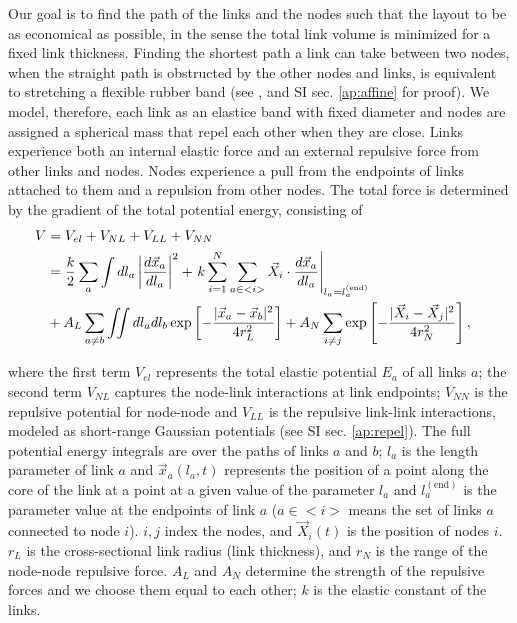 \documentclass[nofootinbib,preprint,floatfix,endfloats]{revtex4} %
\begin{document}
Our goal is to find the path of the links and the nodes such that 
the layout to be as economical as possible, in the sense the total link volume is minimized for a fixed link thickness. 
Finding the shortest path a link can take between two nodes, when the straight path is obstructed by the other nodes and links, is equivalent to stretching a flexible rubber band (see \cite{novikov1984}, and SI sec. \ref{ap:affine} for proof).
We model, therefore, each link as an elastice band with fixed diameter and %
nodes are assigned a spherical mass that repel each other when they are close. 
Links experience both an internal elastic force and an external repulsive force from other links and nodes. 
Nodes experience a pull from the endpoints of links attached to them and a repulsion from other nodes. 
The total force is determined by the gradient of the total potential energy, consisting of 
\begin{align}
    V &= V_{el} + V_{NL} + V_{LL} +V_{NN} \cr 
    &= {k\over 2}\sum_a\int dl_a \left|{d\vec{x}_a\over dl_a} \right|^2 + 
    \left. k\sum_{i=1}^N  \sum_{a\in <i>}  \vec{X}_i \cdot{d\vec{x}_a%
    \over dl_a}\right|_{l_a = l^{(\mathrm{end})}_a}
    \cr
    &+A_L\sum_{a\ne b} \iint dl_adl_b 
    \exp\left[- {|\vec{x}_a-\vec{x}_b|^2 \over 4 r_L^2}\right] + A_N\sum_{i\ne j}  \exp\left[- {|\vec{X}_i-\vec{X}_j|^2 \over 4r_N^2}\right],
 \label{eq:Vfull}
\end{align}

where the first term $V_{el}$ represents the total elastic potential $E_a$ of all links $a$; the second term $V_{NL}$
captures the node-link interactions at link endpoints;
 $V_{NN}$  is the repulsive potential for node-node and  $V_{LL}$ is the repulsive link-link interactions, modeled as short-range Gaussian potentials (see SI sec. \ref{ap:repel}). 
The full potential energy integrals are over the paths of links $a$ and $b$; $l_a$ is the length parameter of link $a$ and  $\vec{x}_a(l_a,t)$ represents the position of a point along the core of the link at a point at a given value of the parameter $l_a$  and $l_a^\mathrm{(end)}$ is the parameter value at the endpoints of link $a$ ($a\in <i>$ means the set of links $a$ connected to node $i$). $i,j$ index the nodes, and $\vec{X}_i(t)$ is the position of nodes $i$. $r_L$ is the cross-sectional link radius (link thickness), and $r_N$ is the range of the node-node repulsive force. $A_L$ and $A_N$ determine the strength of the repulsive forces and we choose them equal to each other; $k$ is the elastic constant of the links.   
\end{document}
